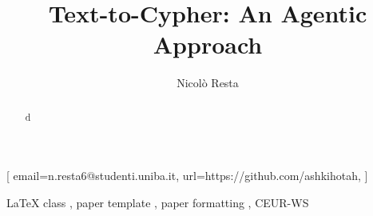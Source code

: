 \documentclass[
]{ceurart}
\begin{document}


\title{Text-to-Cypher: An Agentic Approach}

\author[1]{Nicolò Resta}[%
email=n.resta6@studenti.uniba.it,
url=https://github.com/ashkihotah,
]
\address[1]{
  Department of Computer Science, University of Bari Aldo Moro,
  Via E. Orabona, 4, 70125 Bari, Italy
}


\begin{abstract}
  d
\end{abstract}

\begin{keywords}
  LaTeX class \sep
  paper template \sep
  paper formatting \sep
  CEUR-WS
\end{keywords}

\maketitle







\end{document}
